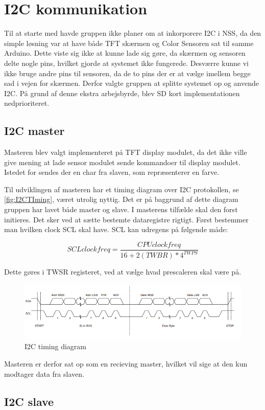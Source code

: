 \graphicspath{{Chapters/Test/}}


\section{I2C kommunikation}
Til at starte med havde gruppen ikke planer om at inkorporere I2C i NSS, da den simple løsning var at have både TFT skærmen og Color Sensoren sat til samme Arduino. Dette viste sig ikke at kunne lade sig gøre, da skærmen og sensoren delte nogle pins, hvilket gjorde at systemet ikke fungerede. Desværre kunne vi ikke bruge andre pins til sensoren, da de to pins der er at vælge imellem begge sad i vejen for skærmen. Derfor valgte gruppen at splitte systemet op og anvende I2C. På grund af denne ekstra arbejsbyrde, blev SD kort implementationen nedprioriteret.



\subsection{I2C master}
Masteren blev valgt implementeret på TFT display modulet, da det ikke ville give mening at lade sensor modulet sende kommandoer til display modulet. Istedet for sendes der en char fra slaven, som repræsenterer en farve.

Til udviklingen af masteren har et timing diagram over I2C protokollen, se \autoref{fig:I2CTIming}, været utrolig nyttig. Det er på baggrund af dette diagram gruppen har lavet både master og slave. I masterens tilfælde skal den forst initieres. Det sker ved at sætte bestemte dataregistre rigtigt. Først bestemmer man hvilken clock SCL skal have. SCL kan udregens på følgende måde:

\begin{equation}
SCL clock freq = \frac{CPU clock freq}{16+2(TWBR)*4^{TWPS}} 
\end{equation}



Dette gøres i TWSR registeret, ved at vælge hvad prescaleren skal være på. 

\begin{figure}[H]
	\centering
	\includegraphics[width = 450pt]{Img/I2CTiming.png}
	\caption{I2C timing diagram}
	\label{fig:I2CTIming}
\end{figure}

Masteren er derfor sat op som en recieving master, hvilket vil sige at den kun modtager data fra slaven.





\subsection{I2C slave}



